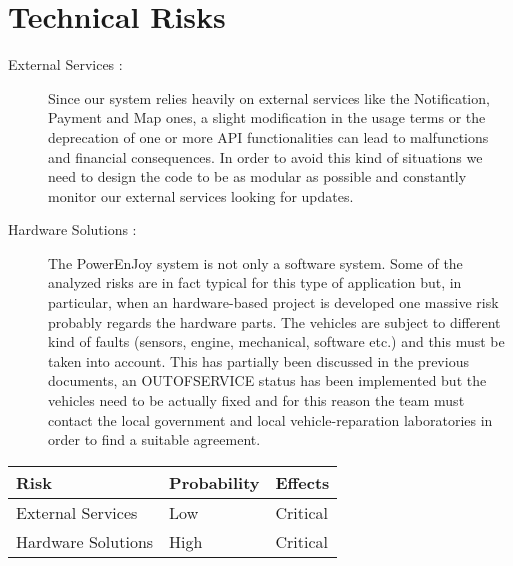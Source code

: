 \section{Technical Risks}
\begin{description}
	\item[External Services :] Since our system relies heavily on external services like the Notification, Payment and Map ones, a slight modification in the usage terms or the deprecation of one or more API functionalities can lead to malfunctions and financial consequences. In order to avoid this kind of situations we need to design the code to be as modular as possible and constantly monitor our external services looking for updates.
	\item[Hardware Solutions :] The PowerEnJoy system is not only a software system. Some of the analyzed risks are in fact typical for this type of application but, in particular, when an hardware-based project is developed one massive risk probably regards the hardware parts. The vehicles are subject to different kind of faults (sensors, engine, mechanical, software etc.) and this must be taken into account. 
	This has partially been discussed in the previous documents, an OUTOFSERVICE status has been implemented but the vehicles need to be actually fixed and for this reason the team must contact the local government and local vehicle-reparation laboratories in order to find a suitable agreement.
\end{description}

\begin{center}
  \begin{tabular}{ |l|l|l| }
    \hline
    Risk & Probability & Effects \\ \hline
    External Services & Low & Critical \\ \hline
    Hardware Solutions & High & Critical \\ \hline
  \end{tabular}
\end{center}


